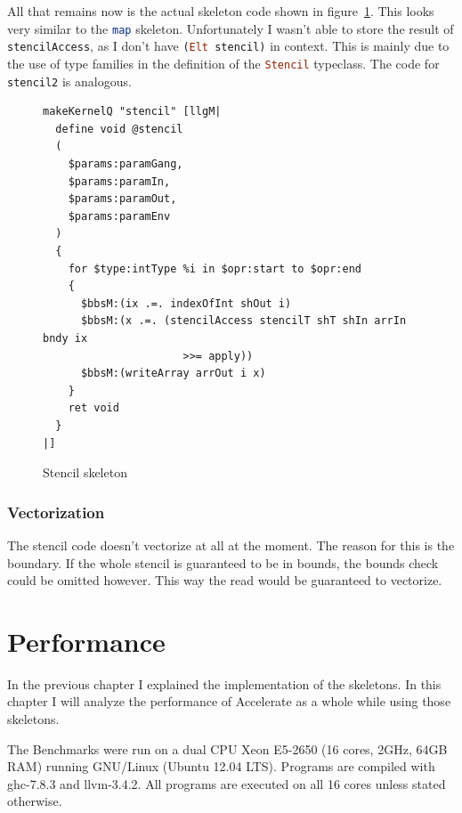 \documentclass[a4paper,bibliography=totocnumbered,parskip,headsepline]{scrbook}
\begin{document}
All that remains now is the actual skeleton code shown in figure~\ref{fig:stencilskel}.
This looks very similar to the \lstinline[language=haskell]!map! skeleton.
Unfortunately I wasn't able to store the result of \lstinline[language=haskell]!stencilAccess!, as I don't have \lstinline[language=haskell]!(Elt stencil)! in context.
This is mainly due to the use of type families in the definition of the \lstinline[language=haskell]!Stencil! typeclass.
The code for \lstinline[language=haskell]!stencil2! is analogous.

\begin{figure}[H]
\begin{lstlisting}
makeKernelQ "stencil" [llgM|
  define void @stencil
  (
    $params:paramGang,
    $params:paramIn,
    $params:paramOut,
    $params:paramEnv
  )
  {
    for $type:intType %i in $opr:start to $opr:end
    {
      $bbsM:(ix .=. indexOfInt shOut i)
      $bbsM:(x .=. (stencilAccess stencilT shT shIn arrIn bndy ix
                      >>= apply))
      $bbsM:(writeArray arrOut i x)
    }
    ret void
  }
|]
\end{lstlisting}
\caption{Stencil skeleton}
\label{fig:stencilskel}
\end{figure}

\subsection*{Vectorization}
The stencil code doesn't vectorize at all at the moment.
The reason for this is the boundary.
If the whole stencil is guaranteed to be in bounds, the bounds check could be omitted however.
This way the read would be guaranteed to vectorize.

\chapter{Performance}
In the previous chapter I explained the implementation of the skeletons.
In this chapter I will analyze the performance of Accelerate as a whole while using those skeletons.

The Benchmarks were run on a dual CPU Xeon E5-2650 (16 cores, 2GHz, 64GB RAM) running GNU/Linux (Ubuntu 12.04 LTS).
Programs are compiled with ghc-7.8.3 and llvm-3.4.2.
All programs are executed on all 16 cores unless stated otherwise.
\end{document}
